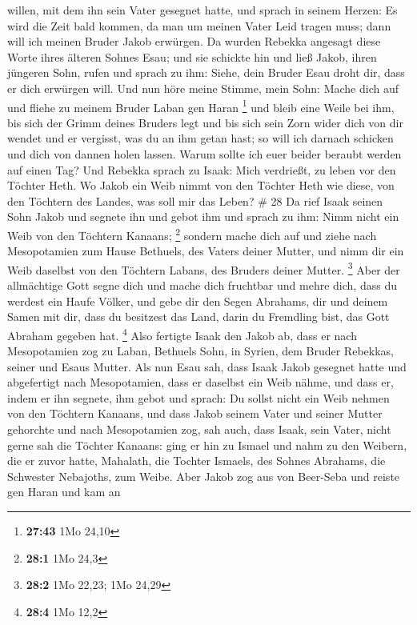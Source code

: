 willen, mit dem ihn sein Vater gesegnet hatte, und sprach in seinem
Herzen: Es wird die Zeit bald kommen, da man um meinen Vater Leid tragen
muss; dann will ich meinen Bruder Jakob erwürgen.  Da
wurden Rebekka angesagt diese Worte ihres älteren Sohnes Esau; und sie
schickte hin und ließ Jakob, ihren jüngeren Sohn, rufen und sprach zu
ihm: Siehe, dein Bruder Esau droht dir, dass er dich erwürgen will.
 Und nun höre meine Stimme, mein Sohn: Mache dich auf und
fliehe zu meinem Bruder Laban gen Haran \footnote{\textbf{27:43} 1Mo
  24,10}  und bleib eine Weile bei ihm, bis sich der Grimm
deines Bruders legt  und bis sich sein Zorn wider dich von
dir wendet und er vergisst, was du an ihm getan hast; so will ich
darnach schicken und dich von dannen holen lassen. Warum sollte ich euer
beider beraubt werden auf einen Tag?  Und Rebekka sprach zu
Isaak: Mich verdrießt, zu leben vor den Töchter Heth. Wo Jakob ein Weib
nimmt von den Töchter Heth wie diese, von den Töchtern des Landes, was
soll mir das Leben? \# 28  Da rief Isaak seinen Sohn Jakob
und segnete ihn und gebot ihm und sprach zu ihm: Nimm nicht ein Weib von
den Töchtern Kanaans; \footnote{\textbf{28:1} 1Mo 24,3} 
sondern mache dich auf und ziehe nach Mesopotamien zum Hause Bethuels,
des Vaters deiner Mutter, und nimm dir ein Weib daselbst von den
Töchtern Labans, des Bruders deiner Mutter. \footnote{\textbf{28:2} 1Mo
  22,23; 1Mo 24,29}  Aber der allmächtige Gott segne dich
und mache dich fruchtbar und mehre dich, dass du werdest ein Haufe
Völker,  und gebe dir den Segen Abrahams, dir und deinem
Samen mit dir, dass du besitzest das Land, darin du Fremdling bist, das
Gott Abraham gegeben hat. \footnote{\textbf{28:4} 1Mo 12,2} 
Also fertigte Isaak den Jakob ab, dass er nach Mesopotamien zog zu
Laban, Bethuels Sohn, in Syrien, dem Bruder Rebekkas, seiner und Esaus
Mutter.  Als nun Esau sah, dass Isaak Jakob gesegnet hatte
und abgefertigt nach Mesopotamien, dass er daselbst ein Weib nähme, und
dass er, indem er ihn segnete, ihm gebot und sprach: Du sollst nicht ein
Weib nehmen von den Töchtern Kanaans,  und dass Jakob seinem
Vater und seiner Mutter gehorchte und nach Mesopotamien zog,
 sah auch, dass Isaak, sein Vater, nicht gerne sah die
Töchter Kanaans:  ging er hin zu Ismael und nahm zu den
Weibern, die er zuvor hatte, Mahalath, die Tochter Ismaels, des Sohnes
Abrahams, die Schwester Nebajoths, zum Weibe.  Aber Jakob
zog aus von Beer-Seba und reiste gen Haran  und kam an
